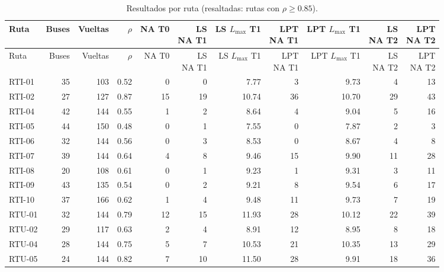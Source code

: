 {\footnotesize
\begin{longtable}{lrrrrrrrrrr}
\caption{Resultados por ruta (resaltadas: rutas con $\rho \geq 0.85$).}\label{tab:rutas}\\
\toprule
Ruta & Buses & Vueltas & $\rho$ & NA T0 & \makecell{LS\\NA T1} & \makecell{LS\\$L_{\max}$ T1} & \makecell{LPT\\NA T1} & \makecell{LPT\\$L_{\max}$ T1} & \makecell{LS\\NA T2} & \makecell{LPT\\NA T2} \\
\midrule\endfirsthead
\toprule
Ruta & Buses & Vueltas & $\rho$ & NA T0 & \makecell{LS\\NA T1} & \makecell{LS\\$L_{\max}$ T1} & \makecell{LPT\\NA T1} & \makecell{LPT\\$L_{\max}$ T1} & \makecell{LS\\NA T2} & \makecell{LPT\\NA T2} \\
\midrule\endhead
\bottomrule\endfoot
RTI-01 & 35 & 103 & 0.52 & 0 & 0 & 7.77 & 3 & 9.73 & 4 & 13 \\
\rowcolor{dorado!20}RTI-02 & 27 & 127 & 0.87 & 15 & 19 & 10.74 & 36 & 10.70 & 29 & 43 \\
RTI-04 & 42 & 144 & 0.55 & 1 & 2 & 8.64 & 4 & 9.04 & 5 & 16 \\
RTI-05 & 44 & 150 & 0.48 & 0 & 1 & 7.55 & 0 & 7.87 & 2 & 3 \\
RTI-06 & 32 & 144 & 0.56 & 0 & 3 & 8.53 & 0 & 8.67 & 4 & 8 \\
RTI-07 & 39 & 144 & 0.64 & 4 & 8 & 9.46 & 15 & 9.90 & 11 & 28 \\
RTI-08 & 20 & 108 & 0.61 & 0 & 1 & 9.23 & 1 & 9.31 & 3 & 11 \\
RTI-09 & 43 & 135 & 0.54 & 0 & 2 & 9.21 & 8 & 9.54 & 6 & 17 \\
RTI-10 & 37 & 166 & 0.62 & 1 & 4 & 9.48 & 11 & 9.73 & 7 & 19 \\
RTU-01 & 32 & 144 & 0.79 & 12 & 15 & 11.93 & 28 & 10.12 & 22 & 39 \\
RTU-02 & 29 & 117 & 0.63 & 2 & 4 & 8.91 & 12 & 8.95 & 8 & 18 \\
RTU-04 & 28 & 144 & 0.75 & 5 & 7 & 10.53 & 21 & 10.35 & 13 & 29 \\
RTU-05 & 24 & 144 & 0.82 & 7 & 10 & 11.50 & 28 & 9.91 & 18 & 36 \\

\end{longtable}}
